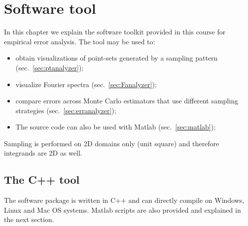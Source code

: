 %
 \chapter{Software tool}
In this chapter we explain the software toolkit provided in this course for empirical error analysis. The tool may be used to:
\begin{itemize}
 \item obtain visualizations of point-sets generated by a sampling pattern (sec.~\ref{sec:ptanalyzer});
 \item visualize Fourier spectra (sec.~\ref{sec:Fanalyzer}); 
 \item compare errors across Monte Carlo estimators that use different sampling strategies (sec.~\ref{sec:erranalyzer}); 
 \item The source code can also be used with Matlab (sec.~\ref{sec:matlab});
\end{itemize}
Sampling is performed on 2D domains only (unit square) and therefore integrands are 2D as well. 

\section{The C++ tool}
The software package is written in C++ and can directly compile on Windows, Linux and Mac OS systems. Matlab scripts are also provided and explained in the next section. 

